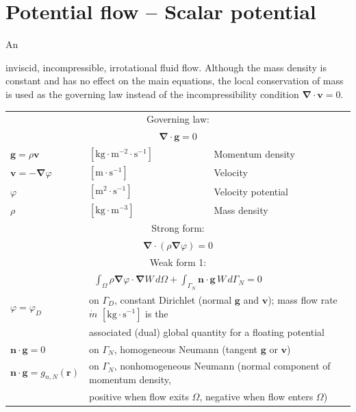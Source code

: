 \documentclass[letterpaper]{article}
\newcommand{\vect}[1]{\mathbf#1}
\newcommand{\nab}{\vect{\nabla}}
\begin{document}
\clearpage
\section{Potential flow -- Scalar potential}
\label{sec_fsp}

\hypertarget{sec_fsp}{An} inviscid, incompressible, irrotational fluid flow. Although the mass density is constant and has no effect on the main equations, the local conservation of mass is used as the governing law instead of the incompressibility condition $\nab\cdot \vect{v}=0$.

\begin{table}[h!]
\centering
\begin{tabular}{lll}
\hline
\multicolumn{3}{c}{Governing law:} \\
\multicolumn{3}{c}{$\nab\cdot\vect{g}=0$}\\
$\vect{g}=\rho \vect{v}$ & $[\text{kg}\cdot \text{m}^{-2}\cdot\text{s}^{-1}]$ & Momentum density\\
$\vect{v}=-\nab \varphi$ & $[\text{m}\cdot \text{s}^{-1}]$ & Velocity\\
$\varphi$ & $[\text{m}^{2}\cdot \text{s}^{-1}]$ & Velocity potential\\
$\rho$ & $[\text{kg}\cdot \text{m}^{-3}]$ & Mass density\\
\hline

\multicolumn{3}{c}{Strong form:} \\
\multicolumn{3}{c}{$\nab\cdot\left(\rho\nab \varphi\right)=0$}\\

\hline

\multicolumn{3}{c}{Weak form 1:} \\[1pt]
\multicolumn{3}{c}{$\displaystyle\int_\Omega \rho \nab \varphi\cdot\nab W\,d\Omega+
\int_{\Gamma_N}\vect{n}\cdot\vect{g}\,W\,d{\Gamma_N}=0$}\\[8pt]
  $\varphi=\varphi_D$ & \multicolumn{2}{l}{on $\Gamma_D$, constant Dirichlet (normal $\vect{g}$ and $\vect{v}$); mass flow rate $\dot{m}$ $[\text{kg}\cdot \text{s}^{-1}]$ is the}\\
 & \multicolumn{2}{l}{associated (dual) global quantity for a floating potential}\\
$\vect{n}\cdot\vect{g}=0$ & \multicolumn{2}{l}{on $\Gamma_N$, homogeneous Neumann (tangent $\vect{g}$ or $\vect{v}$)}\\
$\vect{n}\cdot\vect{g}=g_{n,N}(\vect{r})$ & \multicolumn{2}{l}{on $\Gamma_N$, nonhomogeneous Neumann (normal component of momentum density,}\\
 & \multicolumn{2}{l}{positive when flow exits $\Omega$, negative when flow enters $\Omega$)}\\
 

\end{tabular}
\end{table}
\end{document}
